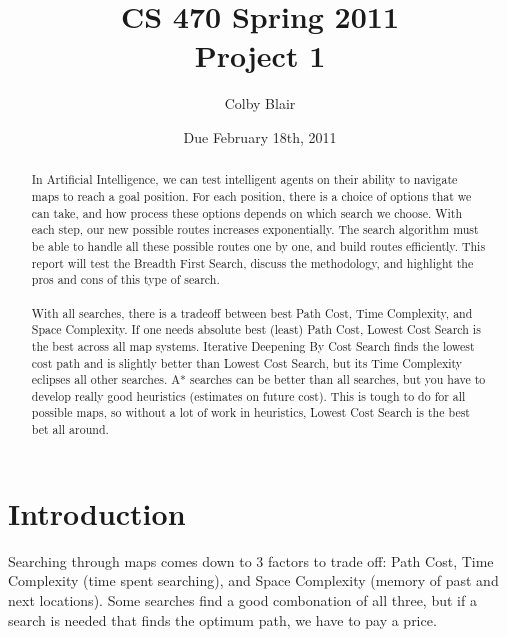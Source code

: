\documentclass[12pt]{article}
\title{CS 470 Spring 2011 \\
     Project 1}
\author{Colby Blair}
\date{Due February 18th, 2011}
\begin{document}
\maketitle
\begin{abstract}
In Artificial Intelligence, we can test intelligent agents on their ability to navigate maps to reach a goal position. For each position, there is a choice of options that we can take, and how process these options depends on which search we choose. With each step, our new possible routes increases exponentially. The search algorithm must be able to handle all these possible routes one by one, and build routes efficiently. This report will test the Breadth First Search, discuss the methodology, and highlight the pros and cons of this type of search.
\\ \\
With all searches, there is a tradeoff between best Path Cost, Time Complexity, and Space Complexity. If one needs absolute best (least) Path Cost,  Lowest Cost Search is the best across all map systems. Iterative Deepening By Cost Search finds the lowest cost path and is slightly better than Lowest Cost Search, but its Time Complexity eclipses all other searches. A* searches can be better than all searches, but you have to develop really good heuristics (estimates on future cost). This is tough to do for all possible maps, so without a lot of work in heuristics, Lowest Cost Search is the best bet all around.
\end{abstract}
\pagebreak

\tableofcontents



\pagebreak

\section{Introduction}
Searching through maps comes down to 3 factors to trade off: Path Cost, Time Complexity (time spent searching), and Space Complexity (memory of past and next locations). Some searches find a good combonation of all three, but if a search is needed that finds the optimum path, we have to pay a price.
\end{document}
